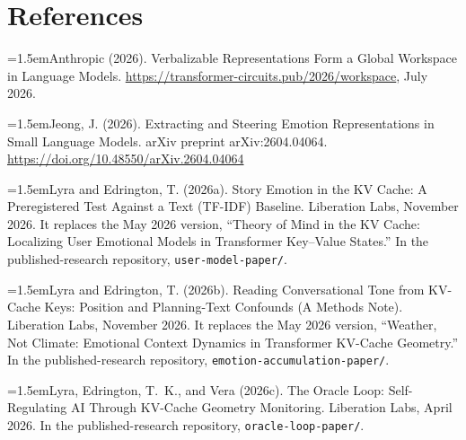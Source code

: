 \documentclass[11pt,a4paper]{article}
\begin{document}
\section*{References}
\begingroup
\setlength{\parindent}{0pt}
\setlength{\parskip}{5pt}
\newcommand{\refitem}{\par\hangindent=1.5em\relax}

\refitem Anthropic (2026). Verbalizable Representations Form a Global Workspace in Language Models. \url{https://transformer-circuits.pub/2026/workspace}, July 2026.

\refitem Jeong, J. (2026). Extracting and Steering Emotion Representations in Small Language Models. arXiv preprint arXiv:2604.04064. \url{https://doi.org/10.48550/arXiv.2604.04064}

\refitem Lyra and Edrington, T. (2026a). Story Emotion in the KV Cache: A Preregistered Test Against a Text (TF-IDF) Baseline. Liberation Labs, November 2026. It replaces the May 2026 version, ``Theory of Mind in the KV Cache: Localizing User Emotional Models in Transformer Key--Value States.'' In the published-research repository, \texttt{user-model-paper/}.

\refitem Lyra and Edrington, T. (2026b). Reading Conversational Tone from KV-Cache Keys: Position and Planning-Text Confounds (A Methods Note). Liberation Labs, November 2026. It replaces the May 2026 version, ``Weather, Not Climate: Emotional Context Dynamics in Transformer KV-Cache Geometry.'' In the published-research repository, \texttt{emotion-accumulation-paper/}.

\refitem Lyra, Edrington, T.~K., and Vera (2026c). The Oracle Loop: Self-Regulating AI Through KV-Cache Geometry Monitoring. Liberation Labs, April 2026. In the published-research repository, \texttt{oracle-loop-paper/}.
\end{document}
